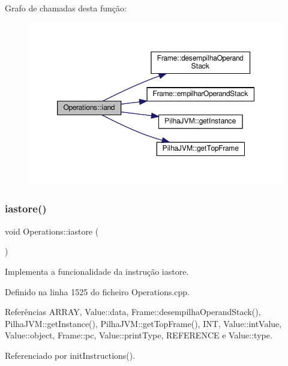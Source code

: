 Grafo de chamadas desta função\+:\nopagebreak
\begin{figure}[H]
\begin{center}
\leavevmode
\includegraphics[width=350pt]{classOperations_a8761c078ea80677ea82a43ab278e76b5_cgraph}
\end{center}
\end{figure}
\mbox{\label{classOperations_aeec162356a6792b1d0ba385f75f443b1}} 
\subsubsection{\texorpdfstring{iastore()}{iastore()}}
{\footnotesize\ttfamily void Operations\+::iastore (\begin{DoxyParamCaption}{ }\end{DoxyParamCaption})\hspace{0.3cm}{\ttfamily [private]}}



Implementa a funcionalidade da instrução iastore. 



Definido na linha 1525 do ficheiro Operations.\+cpp.



Referências A\+R\+R\+AY, Value\+::data, Frame\+::desempilha\+Operand\+Stack(), Pilha\+J\+V\+M\+::get\+Instance(), Pilha\+J\+V\+M\+::get\+Top\+Frame(), I\+NT, Value\+::int\+Value, Value\+::object, Frame\+::pc, Value\+::print\+Type, R\+E\+F\+E\+R\+E\+N\+CE e Value\+::type.



Referenciado por init\+Instructions().

